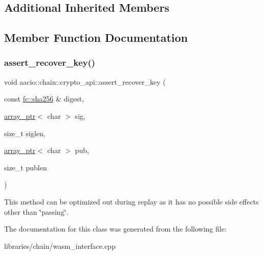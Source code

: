 \subsection*{Additional Inherited Members}


\subsection{Member Function Documentation}
\mbox{\label{classaacio_1_1chain_1_1crypto__api_ac491ec56bcb102b9bd7baa8c1f47073d}} 
\subsubsection{\texorpdfstring{assert\+\_\+recover\+\_\+key()}{assert\_recover\_key()}}
{\footnotesize\ttfamily void aacio\+::chain\+::crypto\+\_\+api\+::assert\+\_\+recover\+\_\+key (\begin{DoxyParamCaption}\item[{const \mbox{\hyperlink{classfc_1_1sha256}{fc\+::sha256}} \&}]{digest,  }\item[{\mbox{\hyperlink{structaacio_1_1chain_1_1array__ptr}{array\+\_\+ptr}}$<$ char $>$}]{sig,  }\item[{size\+\_\+t}]{siglen,  }\item[{\mbox{\hyperlink{structaacio_1_1chain_1_1array__ptr}{array\+\_\+ptr}}$<$ char $>$}]{pub,  }\item[{size\+\_\+t}]{publen }\end{DoxyParamCaption})\hspace{0.3cm}{\ttfamily [inline]}}

This method can be optimized out during replay as it has no possible side effects other than \char`\"{}passing\char`\"{}. 

The documentation for this class was generated from the following file\+:\begin{DoxyCompactItemize}
\item 
libraries/chain/wasm\+\_\+interface.\+cpp\end{DoxyCompactItemize}
